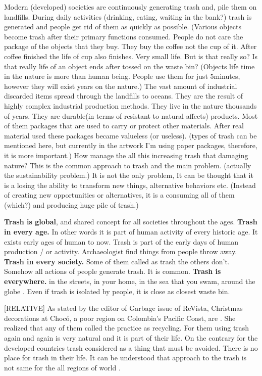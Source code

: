 Modern (developed) societies are continuously generating trash and, pile them on landfills. During daily activities (drinking, eating, waiting in the bank?) trash is generated and people get rid of them as quickly as possible. (Various objects become trash after their primary functions consumed. People do not care the package of the objects that they buy. They buy the coffee not the cup of it. After coffee finished the life of cup also finishes. Very small life. But is that really so? Is that really life of an object ends after tossed on the waste bin?  (Objects life time in the nature is more than human being. People use them for just 5minutes, however they will exist years on the nature.) The vast amount of industrial discarded items spread through the landfills to oceans. They are the result of highly complex industrial production methods.  They live in the nature thousands of years. They are durable(in terms of resistant to natural affects) products. Most of them packages that are used to carry or protect other materials. After real material used these packages became valueless (or useless). (types of trash can be mentioned here, but currently in the artwork I'm using paper packages, therefore, it is more important.) How manage the all this increasing trash that damaging nature?  This is the common approach to trash and the main problem. (actually the sustainability problem.) It is not the only problem, It can be thought that it is a losing the ability to transform new things, alternative behaviors etc. (Instead of creating new opportunities or alternatives, it is a consuming all of them (which?) and producing huge pile of trash.) 

\textbf{Trash is global}, and shared concept for all societies throughout the ages. 
\textbf{Trash in every age.} In other words it is part of human activity of every historic age. It exists early ages of human to now. Trash is part of the early days of human production / or activity. Archaeologist find things from people throw away. 
\textbf{Trash in every society.} Some of them called as trash the others don't. Somehow all actions of people generate trash. It is common. 
\textbf{Trash is everywhere.} in the streets, in your home, in the sea that you swam, around the globe . Even if trash is isolated by people, it is close as closest waste bin.

[RELATIVE] As stated by the editor of Garbage issue of ReVista, Christmas decorations at Chocó, a poor region on Colombia’s Pacific Coast, are  \cite{erlick2015editorsletter}. She realized that any of them called the practice as recycling. For them using trash again and again is very natural and it is part of their life. On the contrary for the developed countries trash considered as a thing that must be avoided. There is no place for trash in their life. It can be understood that approach to the trash is not same for the all regions of world .

